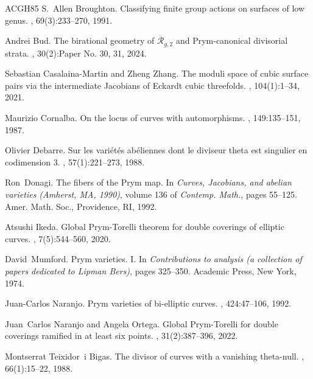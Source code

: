 \documentclass[preprint,12pt]{amsart}
\theoremstyle{plain}
\theoremstyle{definition}
\begin{document}
\begin{thebibliography}{ACGH85}
S.~Allen Broughton.
\newblock Classifying finite group actions on surfaces of low genus.
, 69(3):233--270, 1991.

Andrei Bud.
\newblock The birational geometry of {$\overline{\mathcal R}_{g,2}$} and
  {P}rym-canonical divisorial strata.
, 30(2):Paper No. 30, 31, 2024.

Sebastian Casalaina-Martin and Zheng Zhang.
\newblock The moduli space of cubic surface pairs via the intermediate
  {J}acobians of {E}ckardt cubic threefolds.
, 104(1):1--34, 2021.

Maurizio Cornalba.
\newblock On the locus of curves with automorphisms.
, 149:135--151, 1987.

Olivier Debarre.
\newblock Sur les vari\'et\'es ab\'eliennes dont le diviseur theta est
  singulier en codimension {$3$}.
, 57(1):221--273, 1988.

Ron~Donagi.
\newblock The fibers of the {P}rym map.
\newblock In {\em Curves, {J}acobians, and abelian varieties ({A}mherst, {MA},
  1990)}, volume 136 of {\em Contemp. Math.}, pages 55--125. Amer. Math. Soc.,
  Providence, RI, 1992.

Atsushi Ikeda.
\newblock Global {P}rym-{T}orelli theorem for double coverings of elliptic
  curves.
, 7(5):544--560, 2020.

David~Mumford.
\newblock Prym varieties. {I}.
\newblock In {\em Contributions to analysis (a collection of papers dedicated
  to {L}ipman {B}ers)}, pages 325--350. Academic Press, New York, 1974.

Juan-Carlos Naranjo.
\newblock Prym varieties of bi-elliptic curves.
, 424:47--106, 1992.

Juan~Carlos Naranjo and Angela Ortega.
\newblock Global {P}rym-{T}orelli for double coverings ramified in at least six
  points.
, 31(2):387--396, 2022.

Montserrat Teixidor~i Bigas.
\newblock The divisor of curves with a vanishing theta-null.
, 66(1):15--22, 1988.

\end{thebibliography}
\end{document}
